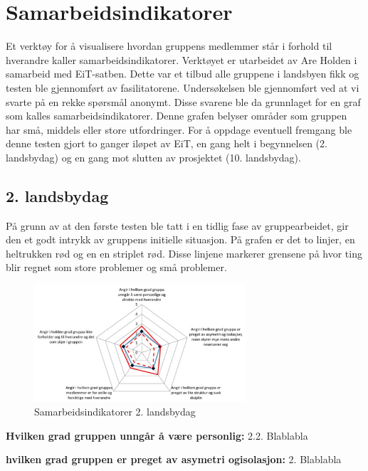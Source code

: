 \section{Samarbeidsindikatorer}
Et verktøy for å visualisere hvordan gruppens medlemmer står i forhold til hverandre kaller samarbeidsindikatorer. 
Verktøyet er utarbeidet av Are Holden i samarbeid med EiT-satben. 
Dette var et tilbud alle gruppene i landsbyen fikk og testen ble gjennomført av fasilitatorene. 
Undersøkelsen ble gjennomført ved at vi svarte på en rekke spørsmål anonymt. 
Disse svarene ble da grunnlaget for en graf som kalles samarbeidsindikatorer. 
Denne grafen belyser områder som gruppen har små, middels eller store utfordringer. 
For å oppdage eventuell fremgang ble denne testen gjort to ganger iløpet av EiT, en gang helt i begynnelsen (2. landsbydag) og en gang mot slutten av prosjektet (10. landsbydag). 

\subsection{2. landsbydag}
På grunn av at den første testen ble tatt i en tidlig fase av gruppearbeidet, gir den et godt intrykk av gruppens initielle situasjon. 
På grafen er det to linjer, en heltrukken rød og en en striplet rød. 
Disse linjene markerer grensene på hvor ting blir regnet som store problemer og små problemer. 
\begin{figure}[H]
    \centering
    \includegraphics[width=0.7\textwidth]{images/sam1.jpeg}	
    \caption{Samarbeidsindikatorer 2. landsbydag}
    \label{fig:sam1}
\end{figure}

\noindent \textbf{Hvilken grad gruppen unngår å være personlig:} 2.2.
\newline
\noindent Blablabla
\vspace{\secspace}

\noindent \textbf{hvilken grad gruppen er preget av asymetri ogisolasjon:} 2.
\newline
\noindent Blablabla
\vspace{\secspace}

